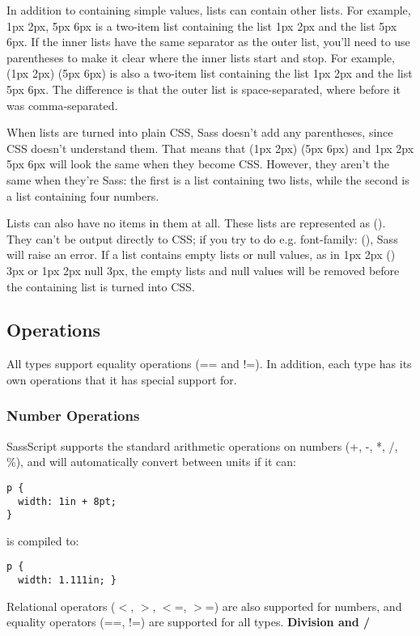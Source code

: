 \documentclass[10pt]{article}
\begin{document}
 In addition to containing simple values, lists can contain other lists. For example, 1px 2px, 5px 6px is a two-item list containing the list 1px 2px and the list 5px 6px. If the inner lists have the same separator as the outer list, you’ll need to use parentheses to make it clear where the inner lists start and stop. For example, (1px 2px) (5px 6px) is also a two-item list containing the list 1px 2px and the list 5px 6px. The difference is that the outer list is space-separated, where before it was comma-separated.


 When lists are turned into plain CSS, Sass doesn’t add any parentheses, since CSS doesn’t understand them. That means that (1px 2px) (5px 6px) and 1px 2px 5px 6px will look the same when they become CSS. However, they aren’t the same when they’re Sass: the first is a list containing two lists, while the second is a list containing four numbers.


 Lists can also have no items in them at all. These lists are represented as (). They can’t be output directly to CSS; if you try to do e.g. font-family: (), Sass will raise an error. If a list contains empty lists or null values, as in 1px 2px () 3px or 1px 2px null 3px, the empty lists and null values will be removed before the containing list is turned into CSS.
\subsection{Operations}


 All types support equality operations (== and !=). In addition, each type has its own operations that it has special support for.
\subsubsection{Number Operations}


 SassScript supports the standard arithmetic operations on numbers (+, -, *, /, \%), and will automatically convert between units if it can:
\begin{verbatim}
p {
  width: 1in + 8pt;
}
\end{verbatim}


 is compiled to:
\begin{verbatim}
p {
  width: 1.111in; }
\end{verbatim}


 Relational operators ($<$, $>$, $<$=, $>$=) are also supported for numbers, and equality operators (==, !=) are supported for all types.
\textbf{Division and /}
\end{document}
